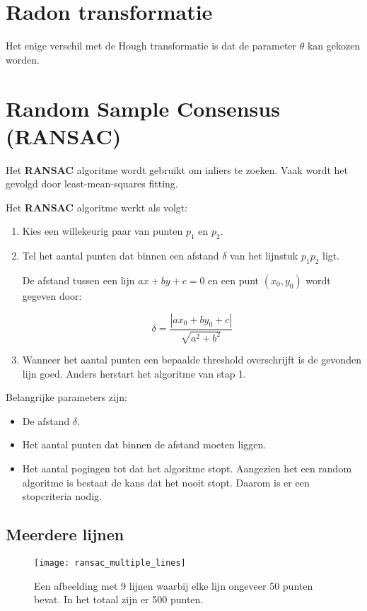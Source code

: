 \section{Radon transformatie}
Het enige verschil met de Hough transformatie is dat de parameter $\theta$ kan gekozen worden.

\section{Random Sample Consensus (RANSAC)}
Het \textbf{RANSAC} algoritme wordt gebruikt om inliers te zoeken. Vaak wordt het gevolgd door least-mean-squares fitting.


Het \textbf{RANSAC} algoritme werkt als volgt:
\begin{enumerate}
	\item Kies een willekeurig paar van punten $p_1$ en $p_2$.
	\item Tel het aantal punten dat binnen een afstand $\delta$ van het lijnstuk $p_1p_2$ ligt. 
	
	De afstand tussen een lijn $ax + by + c = 0$ en een punt $(x_0, y_0)$ wordt gegeven door:
	
	$$\delta = \frac{|ax_0 + by_0 + c|}{\sqrt{a^2 + b^2}}$$
	\item Wanneer het aantal punten een bepaalde threshold overschrijft is de gevonden lijn goed. Anders herstart het algoritme van stap 1.
\end{enumerate} 

Belangrijke parameters zijn:
\begin{itemize}
	\item De afstand $\delta$.
	\item Het aantal punten dat binnen de afstand moeten liggen.
	\item Het aantal pogingen tot dat het algoritme stopt. Aangezien het een random algoritme is bestaat de kans dat het nooit stopt. Daarom is er een stopcriteria nodig.
\end{itemize}

\subsection{Meerdere lijnen}
\begin{figure}[t]
	\centering
	\texttt{[image: ransac\_multiple\_lines]}
	\caption{Een afbeelding met 9 lijnen waarbij elke lijn ongeveer 50 punten bevat. In het totaal zijn er 500 punten.}
	\label{fig:ransac_multiple_lines}
\end{figure}

